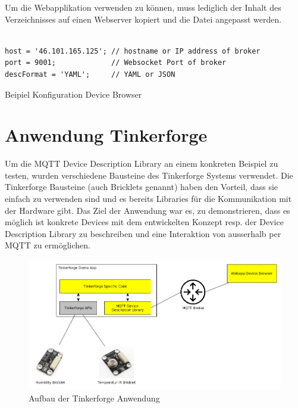 {Um die Webapplikation verwenden zu können, muss lediglich der Inhalt des Verzeichnisses \newline  {} auf einen Webserver kopiert und die Datei  angepasst werden.

\begin{listing}[H]
\begin{verbatim}

host = '46.101.165.125'; // hostname or IP address of broker
port = 9001;             // Websocket Port of broker
descFormat = 'YAML';     // YAML or JSON

\end{verbatim}
\caption{Beipiel Konfiguration Device Browser}
\end{listing}



\section{Anwendung Tinkerforge}

Um die MQTT Device Description Library an einem konkreten Beispiel zu testen, wurden verschiedene Bausteine des Tinkerforge Systems verwendet. Die Tinkerforge Bausteine (auch Bricklets genannt) haben den Vorteil, dass sie einfach zu verwenden sind und es bereits Libraries für die Kommunikation mit der Hardware gibt. Das Ziel der Anwendung war es, zu demonstrieren, dass es möglich ist konkrete Devices mit dem entwickelten Konzept resp. der Device Description Library zu beschreiben und eine Interaktion von ausserhalb per MQTT zu ermöglichen.

\begin{figure}[H]
	\centering
        \includegraphics[width=1.0\linewidth]{diag/tf_arch.png}
    \caption{Aufbau der Tinkerforge Anwendung}
\end{figure}

}
